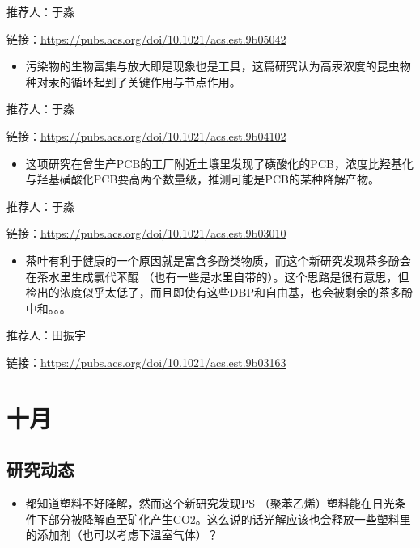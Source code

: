 \documentclass[]{book}
\providecommand{\tightlist}{%
  \setlength{\itemsep}{0pt}\setlength{\parskip}{0pt}}
\begin{document}
推荐人：于淼

链接：\url{https://pubs.acs.org/doi/10.1021/acs.est.9b05042}

\begin{itemize}
\tightlist
\item
  污染物的生物富集与放大即是现象也是工具，这篇研究认为高汞浓度的昆虫物种对汞的循环起到了关键作用与节点作用。
\end{itemize}

推荐人：于淼

链接：\url{https://pubs.acs.org/doi/10.1021/acs.est.9b04102}

\begin{itemize}
\tightlist
\item
  这项研究在曾生产PCB的工厂附近土壤里发现了磺酸化的PCB，浓度比羟基化与羟基磺酸化PCB要高两个数量级，推测可能是PCB的某种降解产物。
\end{itemize}

推荐人：于淼

链接：\url{https://pubs.acs.org/doi/10.1021/acs.est.9b03010}

\begin{itemize}
\tightlist
\item
  茶叶有利于健康的一个原因就是富含多酚类物质，而这个新研究发现茶多酚会在茶水里生成氯代苯醌 （也有一些是水里自带的）。这个思路是很有意思，但检出的浓度似乎太低了，而且即使有这些DBP和自由基，也会被剩余的茶多酚中和。。。
\end{itemize}

推荐人：田振宇

链接：\url{https://pubs.acs.org/doi/10.1021/acs.est.9b03163}

\hypertarget{ux5341ux6708-1}{%
\section*{十月}\label{ux5341ux6708-1}}

\hypertarget{ux7814ux7a76ux52a8ux6001-23}{%
\subsection*{研究动态}\label{ux7814ux7a76ux52a8ux6001-23}}

\begin{itemize}
\tightlist
\item
  都知道塑料不好降解，然而这个新研究发现PS （聚苯乙烯）塑料能在日光条件下部分被降解直至矿化产生CO2。这么说的话光解应该也会释放一些塑料里的添加剂（也可以考虑下温室气体）？
\end{itemize}
\end{document}
